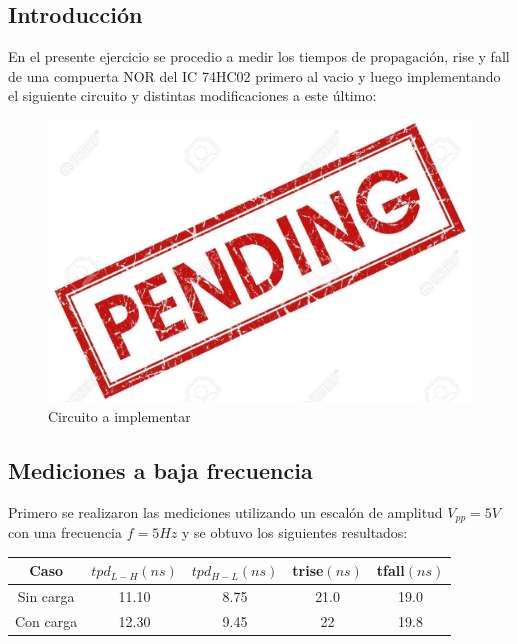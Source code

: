 


\subsection{Introducción}

En el presente ejercicio se procedio a medir los tiempos de propagación, rise y fall de una compuerta NOR del IC 74HC02 primero al vacio y luego implementando el siguiente circuito y distintas modificaciones a este último:

\begin{figure}[h]
    \centering
    \includegraphics{ImagenesEjercicio4/pend.jpg}
    \caption{Circuito a implementar}
\end{figure}

\subsection{Mediciones a baja frecuencia}

Primero se realizaron las mediciones utilizando un escalón de amplitud $V_{pp}=5V$ con una frecuencia $f=5 Hz$ y se obtuvo los siguientes resultados:

\begin{table}[H]
\centering
\begin{tabular}{|c|c|c|c|c|}
\hline
Caso & $tpd_{L-H}(ns)$ & $tpd_{H-L}(ns)$ & trise$(ns)$ & tfall$(ns)$ \\ \hline
Sin carga & 11.10 & 8.75 & 21.0 & 19.0 \\ \hline
Con carga & 12.30 & 9.45 & 22 & 19.8 \\ \hline
\end{tabular}
\end{table}

